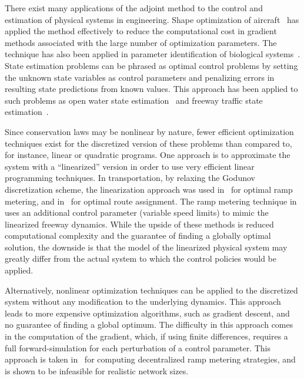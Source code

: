 There exist many applications of the adjoint method to the control and estimation of physical systems in engineering. Shape optimization of aircraft~\cite{Reuther1996,Giles1997,Moin1994} has applied the method effectively to reduce the computational cost in gradient methods associated with the large number of optimization parameters. The technique has also been applied in parameter identification of biological systems~\cite{Raffard2008}. State estimation problems can be phrased as optimal control problems by setting the unknown state variables as control parameters and penalizing errors in resulting state predictions from known values. This approach has been applied to such problems as open water state estimation~\cite{Castaings2006,Strub2009} and freeway traffic state estimation~\cite{Jacqueta}.

Since conservation laws may be nonlinear by nature, fewer efficient optimization techniques exist for the discretized version of these problems than compared to, for instance, linear or quadratic programs. One approach is to approximate the system with a ``linearized'' version in order to use very efficient linear programming techniques. In transportation, by relaxing the Godunov discretization scheme, the linearization approach was used in~\cite{gomes2006optimal} for optimal ramp metering, and in~\cite{ziliaskopoulos2000linear} for optimal route assignment. The ramp metering technique in~\cite{Muralidharana} uses an additional control parameter (variable speed limits) to mimic the linearized freeway dynamics. While the upside of these methods is reduced computational complexity and the guarantee of finding a globally optimal solution, the downside is that the model of the linearized physical system may greatly differ from the actual system to which the control policies would be applied.

Alternatively, nonlinear optimization techniques can be applied to the discretized system without any modification to the underlying dynamics. This approach leads to more expensive optimization algorithms, such as gradient descent, and no guarantee of finding a global optimum. The difficulty in this approach comes in the computation of the gradient, which, if using finite differences, requires a full forward-simulation for each perturbation of a control parameter. This approach is taken in~\cite{Ramon2013,Frejo2011} for computing decentralized ramp metering strategies, and is shown to be infeasible for realistic network sizes.


